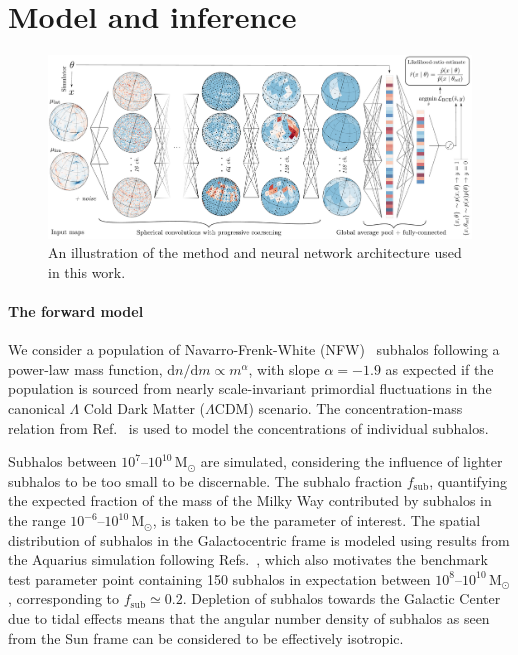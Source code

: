 \documentclass[preprint]{article}
\begin{document}
\section{Model and inference}
\label{sec:model}

\begin{figure}[!htbp]
\centering
\includegraphics[width=1.00\textwidth]{figures/drawing.pdf}
\caption{An illustration of the method and neural network architecture used in this work.}
\label{fig:model}
\end{figure}

\paragraph{The forward model} We consider a population of Navarro-Frenk-White (NFW)~\cite{Navarro:1995iw} subhalos following a power-law mass function, $\mathrm dn / \mathrm dm \propto m^\alpha$, with slope $\alpha = -1.9$ as expected if the population is sourced from nearly scale-invariant primordial fluctuations in the canonical $\Lambda$ Cold Dark Matter ($\Lambda$CDM) scenario. The concentration-mass relation from Ref.~\cite{Sanchez-Conde:2013yxa} is used to model the concentrations of individual subhalos. 

Subhalos between $10^7$--$10^{10}\,\mathrm{M}_\odot$ are simulated, considering the influence of lighter subhalos to be too small to be discernable.
The subhalo fraction $f_\mathrm{sub}$, quantifying the expected fraction of the mass of the Milky Way contributed by subhalos in the range $10^{-6}$--$10^{10}\,\mathrm{M}_\odot$, is taken to be the parameter of interest. The spatial distribution of subhalos in the Galactocentric frame is modeled using results from the Aquarius simulation following Refs.~\cite{Hutten:2016jko,Springel:2008cc}, which also motivates the benchmark test parameter point containing 150 subhalos in expectation between $10^{8}$--$10^{10}\,\mathrm{M}_\odot$, corresponding to $f_\mathrm{sub} \simeq 0.2$. Depletion of subhalos towards the Galactic Center due to tidal effects means that the angular number density of subhalos as seen from the Sun frame can be considered to be effectively isotropic.
\end{document}
